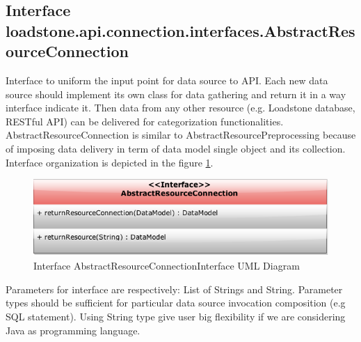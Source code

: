\subsection{Interface \newline loadstone.api.connection.interfaces.AbstractResourceConnection}
Interface to uniform the input point for data source to API. Each new data source should implement its own class for data gathering and return it in a way interface indicate it. Then data from any other resource (e.g. Loadstone database, RESTful API) can be delivered for categorization functionalities. AbstractResourceConnection is similar to AbstractResourcePreprocessing because of imposing data delivery in term of data model single object and its collection. Interface organization is depicted in the figure \ref{fig:@=connection}.   
\begin{figure}[h]
	\centering
	\includegraphics[scale=0.5]{Abstract_Resource_Connection_Interface.png}
	\caption{Interface AbstractResourceConnectionInterface UML Diagram}
	\label{fig:@=connection}
\end{figure}
Parameters for interface are respectively: List of Strings and String. Parameter types should be sufficient for particular data source invocation composition (e.g SQL statement). Using String type give user big flexibility if we are considering Java as programming language.
